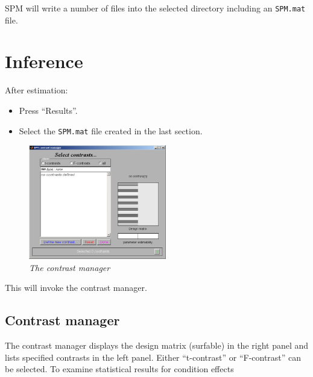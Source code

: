 SPM will write a number of files into the selected directory including an \texttt{SPM.mat} file.

\section{Inference}

After estimation:

\begin{itemize}
\item Press ``Results''.
\item Select the \texttt{SPM.mat} file created in the last section.
\end{itemize}

\begin{figure}
\begin{center}
\includegraphics[width=60mm]{auditory/con_man}
\caption{\emph{The contrast manager}}
\end{center}
\end{figure}

This will invoke the contrast manager.

\subsection{Contrast manager}

The contrast manager displays the design matrix (surfable) in the right panel and lists specified contrasts in the left panel. Either ``t-contrast'' or ``F-contrast'' can be selected. To examine statistical results for condition effects

